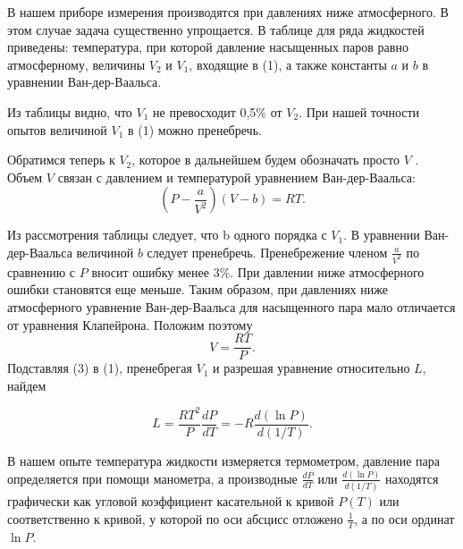 \documentclass[a4paper,12pt]{article} %
\theoremstyle{plain} %
\theoremstyle{definition} %
\theoremstyle{remark} %
\begin{document}
В нашем приборе измерения производятся при давлениях ниже атмосферного.
В этом случае задача существенно упрощается.
В таблице для ряда жидкостей приведены: температура, при которой давление насыщенных паров равно атмосферному, величины $V_2$ и $V_1$, входящие в (1), а также константы $a$ и $b$ в уравнении Ван-дер-Ваальса.

Из таблицы видно, что $V_1$ не превосходит 0,5\% от $V_2$. При нашей точности опытов величиной $V_1$ в (1) можно пренебречь.

Обратимся теперь к $V_2$, которое в дальнейшем будем обозначать просто $V$ . Объем $V$ связан с давлением
и температурой уравнением Ван-дер-Ваальса:
\begin{equation}
\left(P-\dfrac{a}{V^2}\right)(V-b)=RT.
\end{equation}

Из рассмотрения таблицы следует, что b одного порядка с $V_1$. В уравнении Ван-дер-Ваальса величиной $b$ следует пренебречь. Пренебрежение членом $\frac{a}{V^2}$ по сравнению с $P$ вносит ошибку менее 3\%. При давлении ниже атмосферного ошибки становятся еще меньше.
Таким образом, при давлениях ниже атмосферного уравнение Ван-дер-Ваальса для насыщенного пара мало отличается от уравнения Клапейрона.
Положим поэтому
\begin{equation}
V=\dfrac{RT}{P}.
\end{equation}
Подставляя (3) в (1), пренебрегая
$V_1$ и разрешая уравнение относительно $L$, найдем

\begin{equation}
L=\dfrac{RT^2}{P}\dfrac{dP}{dT}=-R\dfrac{d(\ln P)}{d(1/T)}.
\end{equation}

В нашем опыте температура жидкости измеряется термометром, давление пара определяется при помощи манометра,
а производные $\frac{dP}{dT}$ или $\frac{d(\ln P)}{d(1/T)}$ находятся графически как угловой коэффициент касательной к
кривой $P(T)$ или соответственно к кривой, у которой по оси абсцисс отложено $\frac{1}{T}$, а по оси ординат $\ln P$.
\end{document}
